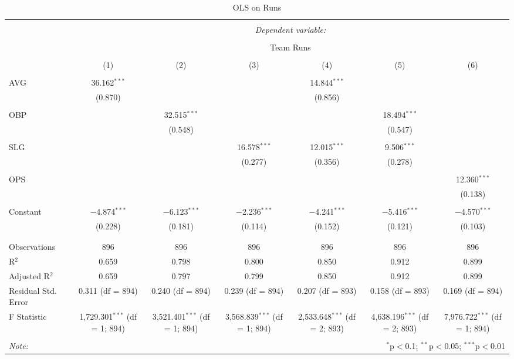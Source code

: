 
\begin{table}[!htbp] \centering
  \caption{OLS on Runs}
  \label{}
  \scriptsize
\begin{tabular}{@{\extracolsep{5pt}}lcccccc}
\\[-1.8ex]\hline
\hline \\[-1.8ex]
 & \multicolumn{6}{c}{\textit{Dependent variable:}} \\
\cline{2-7}
\\[-1.8ex] & \multicolumn{6}{c}{Team Runs} \\
\\[-1.8ex] & (1) & (2) & (3) & (4) & (5) & (6)\\
\hline \\[-1.8ex]
 AVG & 36.162$^{***}$ &  &  & 14.844$^{***}$ &  &  \\
  & (0.870) &  &  & (0.856) &  &  \\
  & & & & & & \\
 OBP &  & 32.515$^{***}$ &  &  & 18.494$^{***}$ &  \\
  &  & (0.548) &  &  & (0.547) &  \\
  & & & & & & \\
 SLG &  &  & 16.578$^{***}$ & 12.015$^{***}$ & 9.506$^{***}$ &  \\
  &  &  & (0.277) & (0.356) & (0.278) &  \\
  & & & & & & \\
 OPS &  &  &  &  &  & 12.360$^{***}$ \\
  &  &  &  &  &  & (0.138) \\
  & & & & & & \\
 Constant & $-$4.874$^{***}$ & $-$6.123$^{***}$ & $-$2.236$^{***}$ & $-$4.241$^{***}$ & $-$5.416$^{***}$ & $-$4.570$^{***}$ \\
  & (0.228) & (0.181) & (0.114) & (0.152) & (0.121) & (0.103) \\
  & & & & & & \\
\hline \\[-1.8ex]
Observations & 896 & 896 & 896 & 896 & 896 & 896 \\
R$^{2}$ & 0.659 & 0.798 & 0.800 & 0.850 & 0.912 & 0.899 \\
Adjusted R$^{2}$ & 0.659 & 0.797 & 0.799 & 0.850 & 0.912 & 0.899 \\
Residual Std. Error & 0.311 (df = 894) & 0.240 (df = 894) & 0.239 (df = 894) & 0.207 (df = 893) & 0.158 (df = 893) & 0.169 (df = 894) \\
F Statistic & 1,729.301$^{***}$ (df = 1; 894) & 3,521.401$^{***}$ (df = 1; 894) & 3,568.839$^{***}$ (df = 1; 894) & 2,533.648$^{***}$ (df = 2; 893) & 4,638.196$^{***}$ (df = 2; 893) & 7,976.722$^{***}$ (df = 1; 894) \\
\hline
\hline \\[-1.8ex]
\textit{Note:}  & \multicolumn{6}{r}{$^{*}$p$<$0.1; $^{**}$p$<$0.05; $^{***}$p$<$0.01} \\
\end{tabular}
\end{table}
